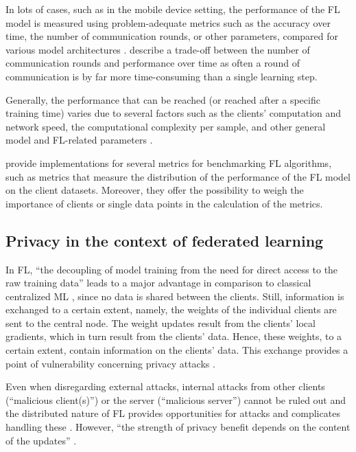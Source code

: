In lots of cases, such as in the mobile device setting, the performance of the FL model is measured using problem-adequate metrics such as the accuracy over time, the number of communication rounds, or other parameters, compared for various model architectures \citep{mcmahan2017communication, sattler2019robust, yang2019federated}. \citet{konevcny2016federated} describe a trade-off between the number of communication rounds and performance over time as often a round of communication is by far more time-consuming than a single learning step.

Generally, the performance that can be reached (or reached after a specific training time) varies due to several factors such as the clients' computation and network speed, the computational complexity per sample, and other general model and FL-related parameters \citep{bonawitz2019towards}.

\citet{caldas2018leaf} provide implementations for several metrics for benchmarking FL algorithms, such as metrics that measure the distribution of the performance of the FL model on the client datasets. Moreover, they offer the possibility to weigh the importance of clients or single data points in the calculation of the metrics.

\subsection{Privacy in the context of federated learning\label{sec:literature_privacy}}
In FL, ``the decoupling of model training from the need for direct access to the raw training data'' \citep{konevcny2016federated} leads to a major advantage in comparison to classical centralized ML \citep{mcmahan2017communication}, since no data is shared between the clients. Still, information is exchanged to a certain extent, namely, the weights of the individual clients are sent to the central node. The weight updates result from the clients' local gradients, which in turn result from the clients' data. Hence, these weights, to a certain extent, contain information on the clients' data. This exchange provides a point of vulnerability concerning privacy attacks \citep{yang2019federated}.

Even when disregarding external attacks, internal attacks from other clients (``malicious client(s)'') or the server (``malicious server'') cannot be ruled out \citep{enthoven2021overview} and the distributed nature of FL provides opportunities for attacks and complicates handling these \citep{sun2019can}. However, ``the strength of privacy benefit depends on the content of the updates'' \citep{mcmahan2017communication}.

